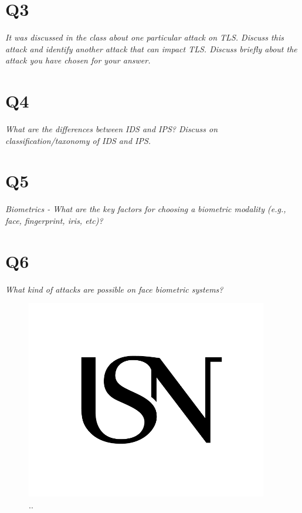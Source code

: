 \documentclass{article}
\begin{document}
\section{Q3}
\begin{tcolorbox}
  \textit{It was discussed in the class about one particular attack on TLS. Discuss this attack and identify another attack that can impact TLS. Discuss briefly about the attack you have chosen for your answer.}
\end{tcolorbox}







\section{Q4}
\begin{tcolorbox}
  \textit{What are the differences between IDS and IPS? Discuss on classification/taxonomy of IDS and IPS.}
\end{tcolorbox}





\section{Q5}
\begin{tcolorbox}
  \textit{Biometrics - What are the key factors for choosing a biometric modality (e.g., face, fingerprint, iris, etc)?}
\end{tcolorbox}


\section{Q6}
\begin{tcolorbox}
  \textit{What kind of attacks are possible on face biometric systems?}
\end{tcolorbox}






\begin{figure}[H]
 \centering
  \includegraphics[width=300pt]{img/usn.png}
 \caption{..}
 \end{figure}
\end{document}
